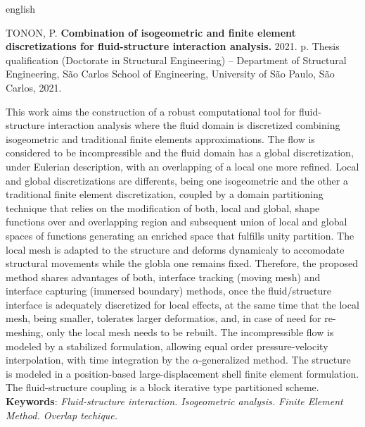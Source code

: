 \documentclass[
	12pt,		
	openright,
	twoside,	
	a4paper,			
	english,	
	french,		
	spanish,		
	brazil				
	]{abntex2}
\begin{document}
\begin{SingleSpace}
\begin{resumo}[Abstract]
	\begin{otherlanguage*}{english}		
		\begin{flushleft}
			TONON, P. \textbf{Combination of isogeometric and finite element discretizations for fluid-structure interaction analysis.} 2021. \pageref{LastPage} p. Thesis qualification (Doctorate in Structural Engineering) – Department of Structural Engineering, São Carlos School of Engineering, University of São Paulo, São Carlos, 2021. \newline 
		\end{flushleft}
		This work aims the construction of a robust computational tool for fluid-structure interaction analysis where the fluid domain is discretized combining isogeometric and traditional finite elements approximations. The flow is considered to be incompressible and the fluid domain has a global discretization, under Eulerian description, with an overlapping of a local one more refined. Local and global discretizations are differents, being one isogeometric and the other a traditional finite element discretization, coupled by a domain partitioning technique that relies on the modification of both, local and global, shape functions over and overlapping region and subsequent union of local and global spaces of functions generating an enriched space that fulfills unity partition. The local mesh is adapted to the structure and deforms dynamicaly to accomodate structural movements while the globla one remains fixed.
		Therefore, the proposed method shares advantages of both, interface tracking (moving mesh) and interface capturing (immersed boundary) methods, once the fluid/structure interface is adequately discretized for local effects, at the same time that the local mesh, being smaller, tolerates larger deformatios, and, in case of need for re-meshing, only the local mesh needs to be rebuilt. The incompressible flow is modeled by a stabilized formulation, allowing equal order pressure-velocity interpolation, with time integration by the $\alpha$-generalized method. The structure is modeled in a position-based large-displacement shell finite element formulation. The fluid-structure coupling is a block iterative type partitioned scheme. 
    	\newline \newline 
    	{\textbf{Keywords}: \textit{Fluid-structure interaction. Isogeometric analysis. Finite Element Method. Overlap techique. }}
	\end{otherlanguage*}
\end{resumo}
\end{SingleSpace}
\end{document}
